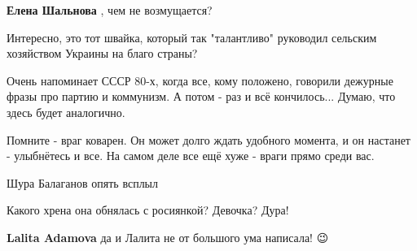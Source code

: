 \begin{itemize}
\begin{itemize}
\textbf{Елена Шальнова} , чем не возмущается?
\end{itemize}

 
Интересно, это тот швайка, который так "талантливо" руководил сельским хозяйством Украины на благо страны?

 
Очень напоминает СССР 80-х, когда все, кому положено, говорили дежурные фразы про партию и коммунизм.
А потом - раз и всё кончилось...
Думаю, что здесь будет аналогично.

 
Помните - враг коварен. Он может долго ждать удобного момента, и он настанет - улыбнётесь и все. На самом деле все ещё хуже - враги прямо среди вас.

 
Шура Балаганов опять всплыл

 
Какого хрена она обнялась с росиянкой? Девочка? Дура!

\begin{itemize}
 
\textbf{Lalita Adamova} да и Лалита не от большого ума написала! 😉
\end{itemize}

\end{itemize}

